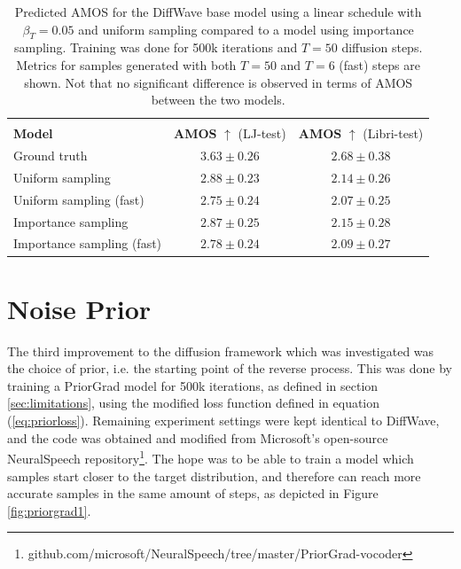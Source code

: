 \documentclass{report}
\begin{document}
\begin{table}[H]
\centering
\def\arraystretch{1.3}
\begin{tabular}{l | c | c }
\hline\hline
\vspace{-0.5cm} \\
\textbf{Model} & \textbf{AMOS} $\uparrow$ (LJ-test) & \textbf{AMOS} $\uparrow$ (Libri-test) \\ [0.5ex]
\hline
Ground truth  & $3.63 \pm 0.26$ & $ 2.68 \pm 0.38$ \\
\hline
Uniform sampling & $2.88 \pm 0.23$ & $ 2.14 \pm 0.26 $ \\
\hline
Uniform sampling (fast) & $2.75 \pm 0.24 $ & $2.07 \pm 0.25$ \\
\hline
Importance sampling & $2.87 \pm 0.25$ & $2.15 \pm 0.28$ \\
\hline
Importance sampling (fast) & $2.78 \pm 0.24 $ & $2.09 \pm 0.27$ \\
\hline\hline
\end{tabular}
\caption{\onehalfspacing Predicted AMOS for the DiffWave base model using a linear schedule with $\beta_T=0.05$ and uniform sampling compared to a model using importance sampling. Training was done for 500k iterations and $T=50$ diffusion steps. Metrics for samples generated with both $T=50$ and $T=6$ (fast) steps are shown. Not that no significant difference is observed in terms of AMOS between the two models.}
\label{table:weightamos}
\end{table}


\section{Noise Prior} \label{sec:noiseprior}

The third improvement to the diffusion framework which was investigated was the choice of prior, i.e. the starting point of the reverse process. This was done by training a PriorGrad model for 500k iterations, as defined in section \ref{sec:limitations}, using the modified loss function defined in equation (\ref{eq:priorloss}). Remaining experiment settings were kept identical to DiffWave, and the code was obtained and modified from Microsoft's open-source NeuralSpeech repository\footnote{github.com/microsoft/NeuralSpeech/tree/master/PriorGrad-vocoder}. The hope was to be able to train a model which samples start closer to the target distribution, and therefore can reach more accurate samples in the same amount of steps, as depicted in Figure \ref{fig:priorgrad1}.
\end{document}
